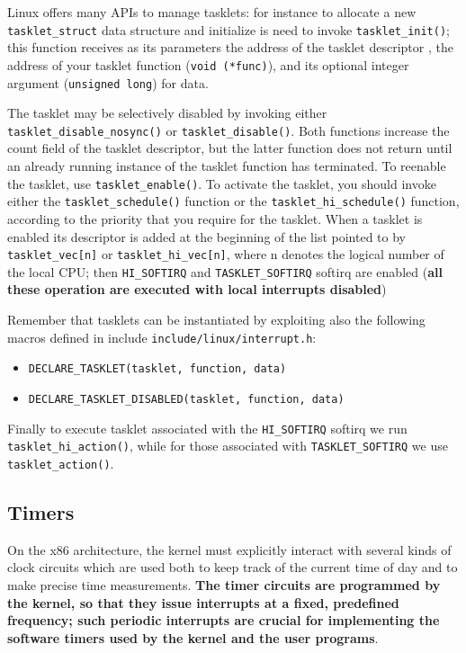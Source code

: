 \documentclass[10pt,a4paper]{article}
\begin{document}
Linux offers many APIs to manage tasklets: for instance to allocate a new \texttt{tasklet\_struct} data structure and
initialize is need to invoke \texttt{tasklet\_init()}; this function receives as its parameters the address of the tasklet descriptor , the address of your tasklet function (\texttt{void (*func)}), and its optional integer argument (\texttt{unsigned long}) for data.

The tasklet may be selectively disabled by invoking either \texttt{tasklet\_disable\_nosync()} or \texttt{tasklet\_disable()}. Both functions increase the count field of the tasklet descriptor, but the latter function does not return until an already running instance of the tasklet function has terminated. To reenable the tasklet, use \texttt{tasklet\_enable()}. To activate the tasklet, you should invoke either the \texttt{tasklet\_schedule()} function or the \texttt{tasklet\_hi\_schedule()} function, according to the priority that you require for the tasklet. When a tasklet is enabled its descriptor is added at the beginning of the list pointed to by \texttt{tasklet\_vec[n]} or \texttt{tasklet\_hi\_vec[n]}, where n denotes the logical number of the local CPU; then \texttt{HI\_SOFTIRQ} and \texttt{TASKLET\_SOFTIRQ} softirq are enabled (\textbf{all these operation are executed with local interrupts disabled})

Remember that tasklets can be instantiated by exploiting also the following macros defined 
in include \texttt{include/linux/interrupt.h}: 
\begin{itemize}
\item \texttt{DECLARE\_TASKLET(tasklet, function, data)}
\item \texttt{DECLARE\_TASKLET\_DISABLED(tasklet, function, data)}
\end{itemize}

Finally to execute tasklet associated with the \texttt{HI\_SOFTIRQ} softirq we run \texttt{tasklet\_hi\_action()}, while for those associated with \texttt{TASKLET\_SOFTIRQ} we use \texttt{tasklet\_action()}. 

\subsection{Timers}

On the x86 architecture, the kernel must explicitly interact with several kinds of clock circuits which are used both to keep track of the current time of day and to make precise time measurements. \textbf{The timer circuits are programmed by the kernel, so that they issue interrupts at a fixed, predefined frequency; such periodic interrupts are crucial for implementing the software timers used by the kernel and the user programs}. 
\end{document}
